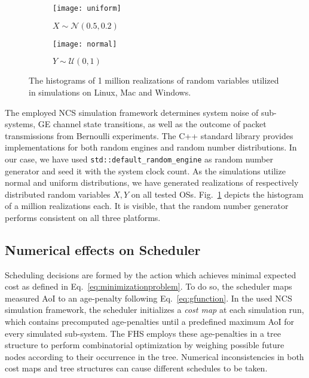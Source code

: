 \begin{figure}[htbp]
  \centering
  \begin{subfigure}[b]{0.49\textwidth}
      \centering
      \texttt{[image: uniform]}
      \caption{$X \sim \mathcal{N}(0.5, 0.2)$}
  \end{subfigure}
  \hfill
  \begin{subfigure}[b]{0.49\textwidth}
      \centering
      \texttt{[image: normal]}
      \caption{$Y \sim \mathcal{U}(0, 1)$}
  \end{subfigure}
    \caption{The histograms of 1 million realizations of random variables utilized in simulations on Linux, Mac and Windows.}
    \label{fig:randomCheck}
\end{figure}

The employed NCS simulation framework determines system noise of sub-systems, GE
channel state transitions, as well as the outcome of packet transmissions from
Bernoulli experiments. The C++ standard library provides implementations for
both random engines and random number distributions. In our case, we have used
\texttt{std::default\_random\_engine} as random number generator and seed it
with the system clock count. As the simulations utilize normal and uniform
distributions, we have generated realizations of respectively distributed random
variables $X, Y$ on all tested OSs. Fig.~\ref{fig:randomCheck} depicts the
histogram of a million realizations each. It is visible, that the random number
generator performs consistent on all three platforms.

\subsection{Numerical effects on Scheduler}

Scheduling decisions are formed by the action which achieves minimal expected
cost as defined in Eq.~\eqref{eq:minimizationproblem}. To do so, the scheduler
maps measured AoI to an age-penalty following Eq.~\eqref{eq:gfunction}. In the
used NCS simulation framework, the scheduler initializes a \textit{cost map} at
each simulation run, which contains precomputed age-penalties until a predefined
maximum AoI for every simulated sub-system. The FHS employs these age-penalties
in a tree structure to perform combinatorial optimization by weighing possible
future nodes according to their occurrence in the tree. Numerical
inconsistencies in both cost maps and tree structures can cause different
schedules to be taken.

